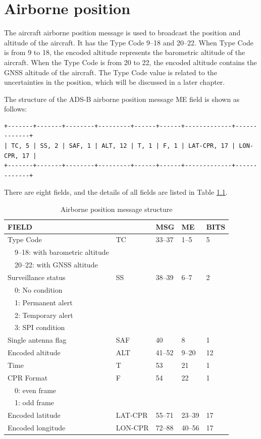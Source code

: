 \chapter{Airborne position} \label{chap:airborn-position}

The aircraft airborne position message is used to broadcast the position and altitude of the aircraft. It has the Type Code 9--18 and 20--22. When Type Code is from 9 to 18, the encoded altitude represents the barometric altitude of the aircraft. When the Type Code is from 20 to 22, the encoded altitude contains the GNSS altitude of the aircraft. The Type Code value is related to the uncertainties in the position, which will be discussed in a later chapter.

The structure of the ADS-B airborne position message ME field is shown as follows:

\begin{verbatim}
+-------+-------+--------+---------+------+------+-------------+-------------+
| TC, 5 | SS, 2 | SAF, 1 | ALT, 12 | T, 1 | F, 1 | LAT-CPR, 17 | LON-CPR, 17 |
+-------+-------+--------+---------+------+------+-------------+-------------+
\end{verbatim}

There are eight fields, and the details of all fields are listed in Table \ref{tb:adsb-air-pos-fields}.

\begin{table}[ht]
\caption{Airborne position message structure}
\label{tb:adsb-air-pos-fields}
\begin{tabular}{|l|l|l|l|l|}
\hline
\textbf{FIELD} & \textbf{} & \textbf{MSG} & \textbf{ME} & \textbf{BITS} \\ \hline
Type Code  & TC & 33--37 & 1--5 & 5 \\ 
~~9--18: with barometric altitude  & & & &\\ 
~~20--22: with GNSS altitude  & & & &\\ \hline
Surveillance status  & SS & 38--39 & 6--7 & 2\\
~~0: No condition & & & &\\ 
~~1: Permanent alert & & & &\\ 
~~2: Temporary alert & & & &\\ 
~~3: SPI condition & & & & \\ \hline
Single antenna flag & SAF & 40 & 8 & 1 \\ \hline
Encoded altitude & ALT & 41--52 & 9--20 & 12 \\ \hline
Time & T & 53 & 21 & 1 \\ \hline
CPR Format  & F & 54 & 22 & 1 \\
~~0: even frame & & & &\\
~~1: odd frame  & & & &\\ \hline
Encoded latitude & LAT-CPR & 55--71 & 23--39 & 17 \\ \hline
Encoded longitude & LON-CPR & 72--88 & 40--56 & 17 \\ \hline
\end{tabular}
\end{table}

